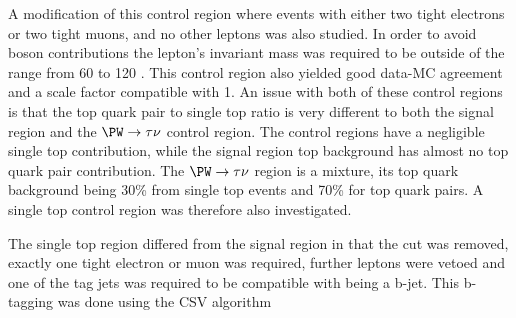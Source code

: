 A modification of this control region where events with either two tight electrons or two tight muons, and no other leptons was also studied. In order to avoid \PZ boson contributions the lepton's invariant mass was required to be outside of the range from 60 to 120 \GeV. This control region also yielded good data-\ac{MC} agreement and a scale factor compatible with 1. An issue with both of these control regions is that the top quark pair to single top ratio is very different to both the signal region and the $\PW\rightarrow\tau\nu$ control region. The control regions have a negligible single top contribution, while the signal region top background has almost no top quark pair contribution. The $\PW\rightarrow\tau\nu$ region is a mixture, its top quark background being 30\% from single top events and 70\% for top quark pairs. A single top control region was therefore also investigated.

The single top region differed from the signal region in that the \jetmetdphi cut was removed, exactly one tight electron or muon was required, further leptons were vetoed and one of the tag jets was required to be compatible with being a b-jet. This b-tagging was done using the \ac{CSV} algorithm %

